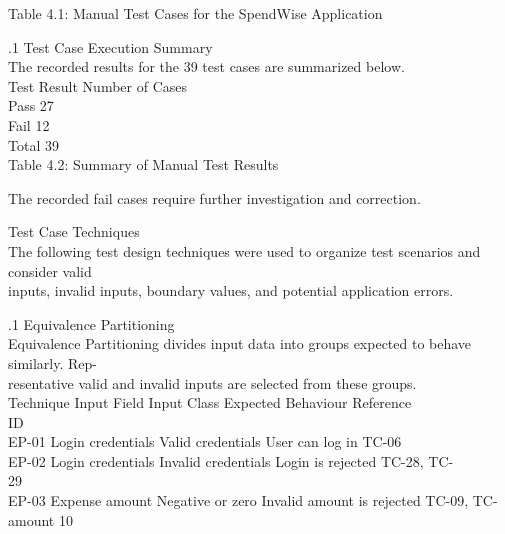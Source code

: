 \documentclass[12pt,a4paper]{report}
\begin{document}
\smallskip
Table 4.1: Manual Test Cases for the SpendWise Application\\ 

\smallskip

\smallskip

.1 Test Case Execution Summary\\ 

\smallskip
The recorded results for the 39 test cases are summarized below.\\ 

\smallskip
Test Result                      Number of Cases\\ 
Pass                                          27\\ 
Fail                                          12\\ 
Total                                         39\\ 

\smallskip
Table 4.2: Summary of Manual Test Results\\ 

\smallskip

\smallskip
The recorded fail cases require further investigation and correction.\\ 

\smallskip

 Test Case Techniques\\ 

\smallskip
The following test design techniques were used to organize test scenarios and consider valid\\ 
inputs, invalid inputs, boundary values, and potential application errors.\\ 

\smallskip

.1 Equivalence Partitioning\\ 

\smallskip
Equivalence Partitioning divides input data into groups expected to behave similarly. Rep-\\ 
resentative valid and invalid inputs are selected from these groups.\\ 

\smallskip
Technique Input Field          Input Class        Expected Behaviour                Reference\\ 
ID\\ 
EP-01       Login credentials Valid credentials   User can log in                   TC-06\\ 
EP-02       Login credentials Invalid credentials Login is rejected                 TC-28, TC-\\ 
29\\ 
EP-03       Expense amount     Negative or zero Invalid amount is rejected          TC-09, TC-\\ 
amount                                               10\\ 
\end{document}
